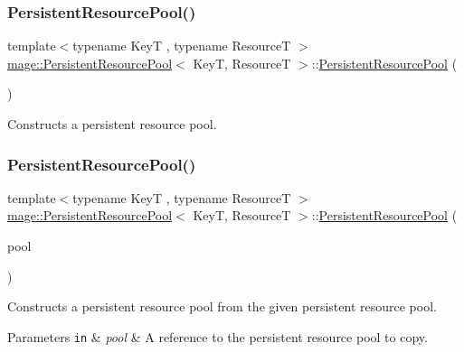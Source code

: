\subsubsection{\texorpdfstring{Persistent\+Resource\+Pool()}{PersistentResourcePool()}\hspace{0.1cm}{\footnotesize\ttfamily [1/3]}}
{\footnotesize\ttfamily template$<$typename KeyT , typename ResourceT $>$ \\
\mbox{\hyperlink{classmage_1_1_persistent_resource_pool}{mage\+::\+Persistent\+Resource\+Pool}}$<$ KeyT, ResourceT $>$\+::\mbox{\hyperlink{classmage_1_1_persistent_resource_pool}{Persistent\+Resource\+Pool}} (\begin{DoxyParamCaption}{ }\end{DoxyParamCaption})\hspace{0.3cm}{\ttfamily [default]}}

Constructs a persistent resource pool. \mbox{\label{classmage_1_1_persistent_resource_pool_af49749cabca4e6e16b2c073f6f550e0b}} 
\subsubsection{\texorpdfstring{Persistent\+Resource\+Pool()}{PersistentResourcePool()}\hspace{0.1cm}{\footnotesize\ttfamily [2/3]}}
{\footnotesize\ttfamily template$<$typename KeyT , typename ResourceT $>$ \\
\mbox{\hyperlink{classmage_1_1_persistent_resource_pool}{mage\+::\+Persistent\+Resource\+Pool}}$<$ KeyT, ResourceT $>$\+::\mbox{\hyperlink{classmage_1_1_persistent_resource_pool}{Persistent\+Resource\+Pool}} (\begin{DoxyParamCaption}\item[{const \mbox{\hyperlink{classmage_1_1_persistent_resource_pool}{Persistent\+Resource\+Pool}}$<$ KeyT, ResourceT $>$ \&}]{pool }\end{DoxyParamCaption})\hspace{0.3cm}{\ttfamily [delete]}}

Constructs a persistent resource pool from the given persistent resource pool.


\begin{DoxyParams}[1]{Parameters}
\mbox{\tt in}  & {\em pool} & A reference to the persistent resource pool to copy. \\
\hline
\end{DoxyParams}
\mbox{\label{classmage_1_1_persistent_resource_pool_acf26c05e2e6031720fa92fb0cec0d398}} 
